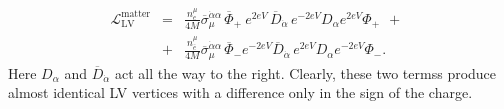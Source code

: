 \documentclass[paper,12pt]{revtex4}
\begin{document}
\begin{eqnarray*}
	\mathcal{L}_{\mathrm{LV}}^{\mathrm{matter}} & = 
  & {\displaystyle 
      \frac{n_e^\mu}
           {4 M}}
                   \overline{\sigma}_\mu^{\dot{\alpha}\alpha} \,
	           \overline{\Phi}_+ ~e^{2eV}\,\overline{D}_{\dot{\alpha}}\,
		    e^{-2eV} D_{\alpha} e^{2eV} \Phi_+ ~~+~~ \\
 & + & {\displaystyle
      \frac{n_{\bar{e}}^\mu}
           {4 M}}
                   \overline{\sigma}_\mu^{\dot{\alpha}\alpha} \,
                   \overline{\Phi}_- e^{-2eV} \overline{D}_{\dot{\alpha}}\,
                   e^{2eV} D_{\alpha} e^{-2eV} \Phi_- .
\end{eqnarray*}
	Here $ D_\alpha $ and $ \overline{D}_{\dot{\alpha}} $
	act all the way to the right.
	Clearly, these two termss  produce almost identical LV vertices with a 
    difference only in the sign of the charge.
\end{document}
